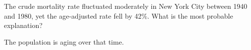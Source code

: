 
The crude mortality rate fluctuated moderately in New York City
between 1940 and 1980, yet the age-adjusted rate fell by 42\%.  What
is the most probable explanation?

\answerSpace{1in}

\begin{AnswerText}
The population is aging over that time.  
\end{AnswerText}


